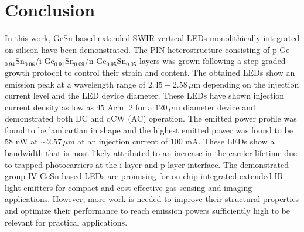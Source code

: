 \section{Conclusion}
In this work, GeSn-based extended-SWIR vertical LEDs monolithically integrated on silicon have been demonstrated. The PIN heterostructure consisting of p-Ge$_{0.94}$Sn$_{0.06}$/i-Ge$_{0.91}$Sn$_{0.09}$/n-Ge$_{0.95}$Sn$_{0.05}$ layers was grown following a step-graded growth protocol to control their strain and content.  The obtained LEDs show an emission peak at a wavelength range of $2.45 - 2.58\,\mu$m depending on the injection current level and the LED device diameter. These LEDs have shown injection current density as low as $45$ Acm$^-2$ for a $120\,\mu$m diameter device and demonstrated both DC and qCW (AC) operation. The emitted power profile was found to be lambartian in shape and the highest emitted power was found to be $58$ nW at $\sim2.57\,\mu$m at an injection current of $100$ mA. These LEDs show a bandwidth that is most likely attributed to an increase in the carrier lifetime due to trapped photocarriers at the i-layer and p-layer interface. The demonstrated group IV GeSn-based LEDs are promising for on-chip integrated extended-IR light emitters for compact and cost-effective gas sensing and imaging applications. However, more work is needed to improve their structural properties and optimize their performance to reach emission powers sufficiently high to be relevant for practical applications.  




\bigskip